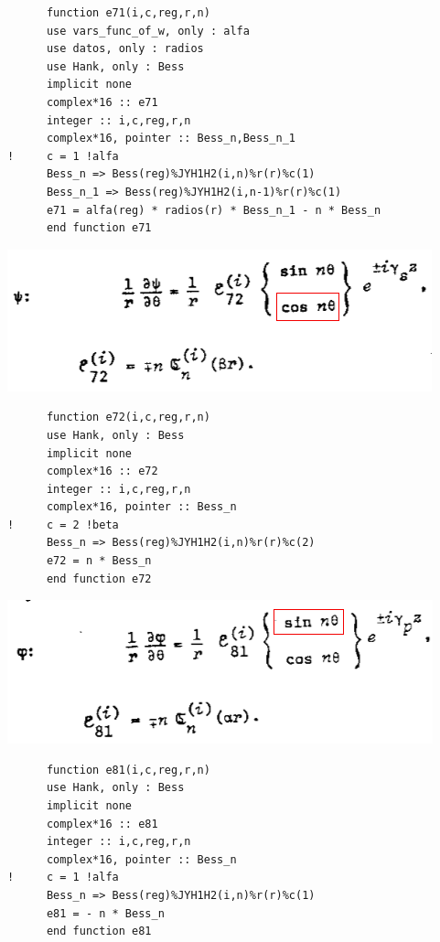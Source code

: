 \documentclass [11pt,spanish]{article}
\begin{document}
\begingroup
\fontsize{10pt}{12pt}
\selectfont
{}
\begin{shaded}
\begin{verbatim}
      function e71(i,c,reg,r,n)
      use vars_func_of_w, only : alfa
      use datos, only : radios
      use Hank, only : Bess
      implicit none
      complex*16 :: e71
      integer :: i,c,reg,r,n
      complex*16, pointer :: Bess_n,Bess_n_1
!     c = 1 !alfa
      Bess_n => Bess(reg)%JYH1H2(i,n)%r(r)%c(1)
      Bess_n_1 => Bess(reg)%JYH1H2(i,n-1)%r(r)%c(1)
      e71 = alfa(reg) * radios(r) * Bess_n_1 - n * Bess_n
      end function e71
\end{verbatim}
\end{shaded}
\endgroup
\includegraphics[scale=0.5]{e72}
\begingroup
\fontsize{10pt}{12pt}
\selectfont
{}
\begin{shaded}
\begin{verbatim}
      function e72(i,c,reg,r,n)
      use Hank, only : Bess
      implicit none
      complex*16 :: e72
      integer :: i,c,reg,r,n
      complex*16, pointer :: Bess_n
!     c = 2 !beta
      Bess_n => Bess(reg)%JYH1H2(i,n)%r(r)%c(2)
      e72 = n * Bess_n
      end function e72
\end{verbatim}
\end{shaded}
\endgroup
\includegraphics[scale=0.5]{e81}
\begingroup
\fontsize{10pt}{12pt}
\selectfont
{}
\begin{shaded}
\begin{verbatim}
      function e81(i,c,reg,r,n)
      use Hank, only : Bess
      implicit none
      complex*16 :: e81
      integer :: i,c,reg,r,n
      complex*16, pointer :: Bess_n
!     c = 1 !alfa
      Bess_n => Bess(reg)%JYH1H2(i,n)%r(r)%c(1)
      e81 = - n * Bess_n
      end function e81
\end{verbatim}
\end{shaded}
\end{document}
